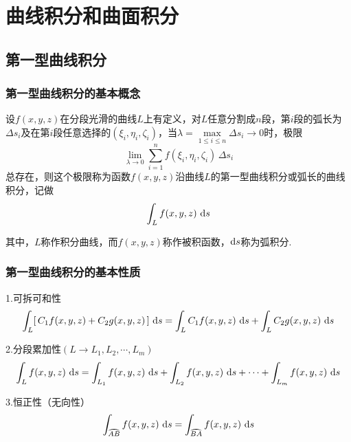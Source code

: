 \thispagestyle{empty}
\chapter{曲线积分和曲面积分}
\section{第一型曲线积分}
\subsection{第一型曲线积分的基本概念}
\vspace*{-1em}

设$f(x,y,z)$在分段光滑的曲线$L$上有定义，对$L$任意分割成$n$段，第$i$段的弧长为$\Delta s_i$及在第$i$段任意选择的$(\xi_i,\eta_i,\zeta_i)$，当$\lambda = \max\limits_{1 \le i \le n} {\Delta s_i}\rightarrow 0$时，极限
\begin{equation}
	\lim_{\lambda \rightarrow 0} \sum^{n}_{i=1} f(\xi_i,\eta_i,\zeta_i)\,\Delta s_i
\end{equation}
总存在，则这个极限称为函数$f(x,y,z)$沿曲线$L$的第一型曲线积分或弧长的曲线积分，记做
\begin{equation}
	\int_{L}f(x,y,z)\,\,{\rm{d}} s
\end{equation}
\par 其中，$L$称作积分曲线，而$f(x,y,z)$称作被积函数，${\rm{d}} s$称为弧积分.

\subsection{第一型曲线积分的基本性质}
\vspace*{-1em}

\theorem[第一型曲线积分的三个基本性质]
1.可拆可和性
\begin{equation}
	\int_{L}[\,C_1f(x,y,z)+C_2g(x,y,z)\,]\,\,{\rm{d}} s =\int_{L}C_1f(x,y,z)\,\,{\rm{d}} s + \int_{L}C_2g(x,y,z)\,\,{\rm{d}} s
\end{equation}

\par 2.分段累加性$(L\rightarrow L_1,L_2,\cdots,L_m)$
\begin{equation}
	\int_{L}f(x,y,z)\,\,{\rm{d}} s = \int_{L_1}f(x,y,z)\,\,{\rm{d}} s +\int_{L_2}f(x,y,z)\,\,{\rm{d}} s + \cdots +\int_{L_m}f(x,y,z)\,\,{\rm{d}} s
\end{equation}

\par 3.恒正性（无向性）
\begin{equation}
	\int_{\wideparen{AB}}f(x,y,z)\,\,\d s = \int_{\wideparen{BA}}f(x,y,z)\,\,\d s 
\end{equation}

